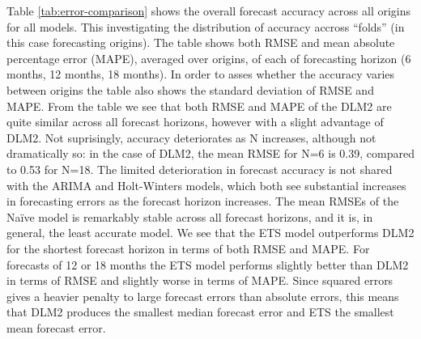 \documentclass[]{article}
\begin{document}
Table \ref{tab:error-comparison} shows the overall forecast accuracy
across all origins for all models. This investigating the distribution
of accuracy accross ``folds'' (in this case forecasting origins). The
table shows both RMSE and mean absolute percentage error (MAPE),
averaged over origins, of each of forecasting horizon (6 months, 12
months, 18 months). In order to asses whether the accuracy varies
between origins the table also shows the standard deviation of RMSE and
MAPE. From the table we see that both RMSE and MAPE of the DLM2 are
quite similar across all forecast horizons, however with a slight
advantage of DLM2. Not suprisingly, accuracy deteriorates as N
increases, although not dramatically so: in the case of DLM2, the mean
RMSE for N=6 is 0.39, compared to 0.53 for N=18. The limited
deterioration in forecast accuracy is not shared with the ARIMA and
Holt-Winters models, which both see substantial increases in forecasting
errors as the forecast horizon increases. The mean RMSEs of the Naïve
model is remarkably stable across all forecast horizons, and it is, in
general, the least accurate model. We see that the ETS model outperforms
DLM2 for the shortest forecast horizon in terms of both RMSE and MAPE.
For forecasts of 12 or 18 months the ETS model performs slightly better
than DLM2 in terms of RMSE and slightly worse in terms of MAPE. Since
squared errors gives a heavier penalty to large forecast errors than
absolute errors, this means that DLM2 produces the smallest median
forecast error and ETS the smallest mean forecast error.
\end{document}
